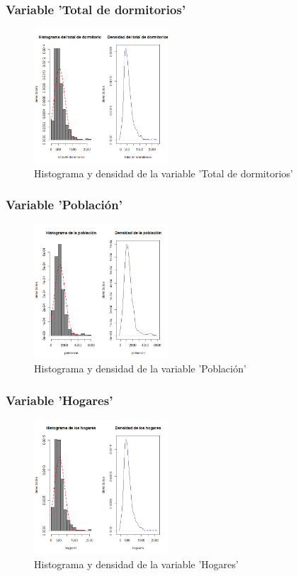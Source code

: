 \documentclass[12pt]{beamer}
\begin{document}
\begin{frame}
\frametitle{Variable 'Total de dormitorios'}
\begin{figure}[!h]
    \begin{center}
        \includegraphics[width=5cm]{imagenes/5.png}
        \caption{Histograma y densidad de la variable 'Total de dormitorios'}
        \label{fig:Densidad}
    \end{center}
\end{figure}
\end{frame}

\begin{frame}
\frametitle{Variable 'Población'}
\begin{figure}[!h]
    \begin{center}
        \includegraphics[width=5cm]{imagenes/6.png}
        \caption{Histograma y densidad de la variable 'Población'}
        \label{fig:Densidad}
    \end{center}
\end{figure}
\end{frame}

\begin{frame}
\frametitle{Variable 'Hogares'}
\begin{figure}[!h]
    \begin{center}
        \includegraphics[width=5cm]{imagenes/7.png}
        \caption{Histograma y densidad de la variable 'Hogares'}
        \label{fig:Densidad}
    \end{center}
\end{figure}
\end{frame}
\end{document}
